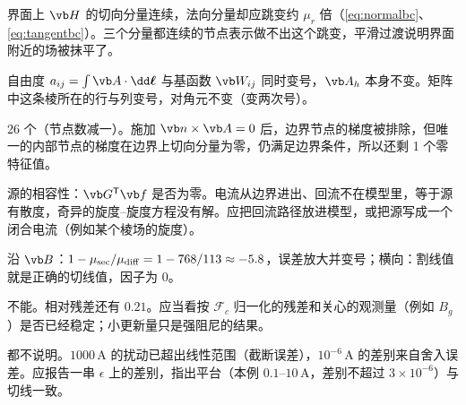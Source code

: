 \begin{answers}
\item 界面上 $\vb H$ 的切向分量连续，法向分量却应跳变约 $\mu_r$ 倍（\eqref{eq:normalbc}、\eqref{eq:tangentbc}）。三个分量都连续的节点表示做不出这个跳变，平滑过渡说明界面附近的场被抹平了。
\item 自由度 $a_{ij}=\int\vb A\cdot\dd\boldsymbol\ell$ 与基函数 $\vb W_{ij}$ 同时变号，$\vb A_h$ 本身不变。矩阵中这条棱所在的行与列变号，对角元不变（变两次号）。
\item 26 个（节点数减一）。施加 $\vb n\times\vb A=0$ 后，边界节点的梯度被排除，但唯一的内部节点的梯度在边界上切向分量为零，仍满足边界条件，所以还剩 1 个零特征值。
\item 源的相容性：$\vb G^{\mathsf T}\vb f$ 是否为零。电流从边界进出、回流不在模型里，等于源有散度，奇异的旋度--旋度方程没有解。应把回流路径放进模型，或把源写成一个闭合电流（例如某个棱场的旋度）。
\item 沿 $\vb B$：$1-\mu_{\rm sec}/\mu_{\rm diff}=1-768/113\approx-5.8$，误差放大并变号；横向：割线值就是正确的切线值，因子为 0。
\item 不能。相对残差还有 $0.21$。应当看按 $\mathcal F_c$ 归一化的残差和关心的观测量（例如 $B_g$）是否已经稳定；小更新量只是强阻尼的结果。
\item 都不说明。$1000\,\mathrm A$ 的扰动已超出线性范围（截断误差），$10^{-6}\,\mathrm A$ 的差别来自舍入误差。应报告一串 $\epsilon$ 上的差别，指出平台（本例 $0.1$--$10\,\mathrm A$，差别不超过 $3\times10^{-6}$）与切线一致。
\end{answers}
